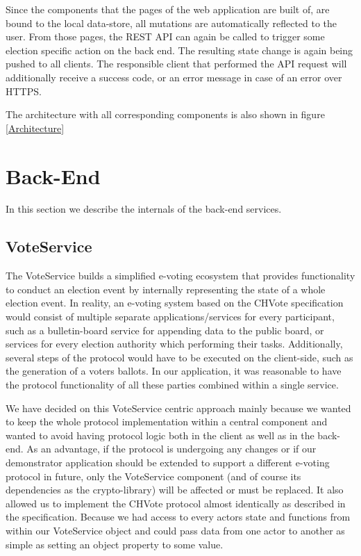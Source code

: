 Since the components that the pages of the web application are built of, are bound to the local data-store, all mutations are automatically reflected to the user. From those pages, the REST API can again be called to trigger some election specific action on the back end. The resulting state change is again being pushed to all clients. The responsible client that performed the API request will additionally receive a success code, or an error message in case of an error over HTTPS.

The architecture with all corresponding components is also shown in figure \ref{Architecture}
\section{Back-End}
In this section we describe the internals of the back-end services.
\subsection{VoteService}
The VoteService builds a simplified e-voting ecosystem that provides functionality to conduct an election event by internally representing the state of a whole election event. In reality, an e-voting system based on the CHVote specification would consist of multiple separate applications/services for every participant, such as a bulletin-board service for appending data to the public board, or services for every election authority which performing their tasks. Additionally, several steps of the protocol would have to be executed on the client-side, such as the generation of a voters ballots. In our application, it was reasonable to have the protocol functionality of all these parties combined within a single service.

We have decided on this VoteService centric approach mainly because we wanted to keep the whole protocol implementation within a central component and wanted to avoid having protocol logic both in the client as well as in the back-end. As an advantage, if the protocol is undergoing any changes or if our demonstrator application should be extended to support a different e-voting protocol in future, only the VoteService component (and of course its dependencies as the crypto-library) will be affected or must be replaced. It also allowed us to implement the CHVote protocol almost identically as described in the specification. Because we had access to every actors state and functions from within our VoteService object and could pass data from one actor to another as simple as setting an object property to some value.

